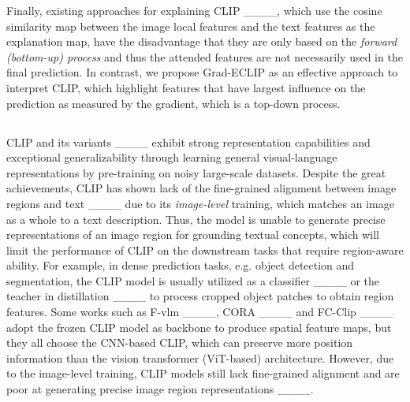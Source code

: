 Finally, existing approaches for explaining CLIP ____, 
which use the cosine similarity map between the image local features and the text features as the explanation map, have the disadvantage that they are only based on the \emph{forward (bottom-up) process} and thus the attended features are not necessarily used in the final prediction. In contrast, we propose Grad-ECLIP as an effective approach to interpret CLIP, which highlight features that have largest influence on the prediction as measured by the gradient, which is a top-down process.


\vspace{-0.1cm}
\subsection{}

CLIP and its variants ____ exhibit strong representation capabilities and exceptional generalizability through learning general visual-language representations by pre-training on noisy large-scale datasets. Despite the great achievements, CLIP has shown lack of the fine-grained alignment between image regions and text ____ due to its \emph{image-level} training, which matches an image as a whole to a text description. Thus, the model is unable to generate precise representations of an image region %
for grounding textual concepts, which will limit the performance of CLIP on the downstream tasks that require region-aware ability. For example, in  dense prediction tasks, e.g. object detection and segmentation, the CLIP model is usually utilized as a classifier ____ or the teacher in distillation ____ to process %
cropped object patches %
to obtain region features. Some works such as F-vlm ____, CORA ____ and FC-Clip ____ adopt the frozen CLIP model as backbone to produce spatial feature maps, but they all choose  the %
CNN-based CLIP, which can preserve more position information than the vision transformer (ViT-based) architecture. However, due to the image-level training, CLIP models still lack fine-grained alignment and are poor at generating precise image region representations ____.

